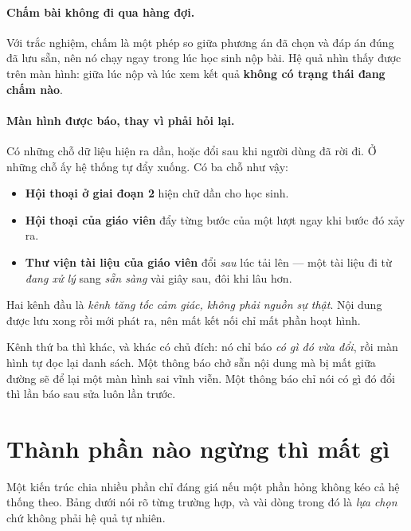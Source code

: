 \paragraph{Chấm bài không đi qua hàng đợi.} Với trắc nghiệm, chấm là một phép so giữa phương án
đã chọn và đáp án đúng đã lưu sẵn, nên nó chạy ngay trong lúc học sinh nộp bài. Hệ quả nhìn thấy
được trên màn hình: giữa lúc nộp và lúc xem kết quả \textbf{không có trạng thái đang chấm nào}.

\paragraph{Màn hình được báo, thay vì phải hỏi lại.} Có những chỗ dữ liệu hiện ra dần, hoặc đổi
sau khi người dùng đã rời đi. Ở những chỗ ấy hệ thống tự đẩy xuống. Có ba chỗ như vậy:

\begin{itemize}
  \item \textbf{Hội thoại ở giai đoạn 2} hiện chữ dần cho học sinh.
  \item \textbf{Hội thoại của giáo viên} đẩy từng bước của một lượt ngay khi bước đó xảy ra.
  \item \textbf{Thư viện tài liệu của giáo viên} đổi \emph{sau} lúc tải lên --- một tài liệu đi
        từ \emph{đang xử lý} sang \emph{sẵn sàng} vài giây sau, đôi khi lâu hơn.
\end{itemize}

Hai kênh đầu là \emph{kênh tăng tốc cảm giác, không phải nguồn sự thật}. Nội dung được lưu xong
rồi mới phát ra, nên mất kết nối chỉ mất phần hoạt hình.

Kênh thứ ba thì khác, và khác có chủ đích: nó chỉ báo \emph{có gì đó vừa đổi}, rồi màn hình tự
đọc lại danh sách. Một thông báo chở sẵn nội dung mà bị mất giữa đường sẽ để lại một màn hình sai
vĩnh viễn. Một thông báo chỉ nói có gì đó đổi thì lần báo sau sửa luôn lần trước.

\section{Thành phần nào ngừng thì mất gì}

Một kiến trúc chia nhiều phần chỉ đáng giá nếu một phần hỏng không kéo cả hệ thống theo. Bảng
dưới nói rõ từng trường hợp, và vài dòng trong đó là \emph{lựa chọn} chứ không phải hệ quả tự
nhiên.

